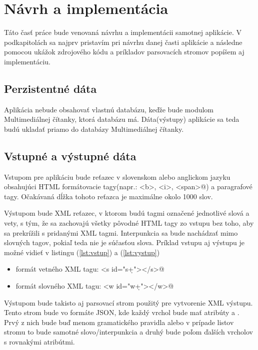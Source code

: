 \documentclass[12pt,a4paper]{report}
\theoremstyle{definition}
\theoremstyle{remark}
\begin{document}

\chapter{Návrh a implementácia}
Táto časť práce bude venovaná návrhu a implementácii samotnej aplikácie. V podkapitolách sa najprv pristavím pri návrhu danej časti aplikácie a následne pomocou ukážok zdrojového kódu a príkladov parsovacích stromov popíšem aj implementáciu.

\section{Perzistentné dáta}
Aplikácia nebude obsahovať vlastnú databázu, keďže bude modulom Multimediálnej čítanky, ktorá databázu má. Dáta(výstupy) aplikácie sa teda budú ukladať priamo do databázy Multimediálnej čítanky.

\section{Vstupné a výstupné dáta}
Vstupom pre aplikáciu bude reťazec v slovenskom alebo anglickom jazyku obsahujúci HTML formátovacie tagy(napr.: \verb@<b>, <i>, <span>@) a paragrafové tagy. Očakávaná dĺžka tohoto reťazca je maximálne okolo 1000 slov.

Výstupom bude XML reťazec, v ktorom budú tagmi označené jednotlivé slová a vety, s tým, že sa zachovajú všetky pôvodné HTML tagy zo vstupu bez toho, aby sa prekrížili s pridanými XML tagmi. Interpunkcia sa bude nachádzať mimo slovných tagov, pokiaľ teda nie je súčasťou slova. Príklad vstupu aj výstupu je možné vidieť v listingu (\ref{lst:vstup}) a (\ref{lst:vystup})
\begin{itemize}
\item formát vetného XML tagu: \verb@<s id="s\d+"></s>@
\item formát slovného XML tagu: \verb@<w id="w\d+"></w>@
\end{itemize}

Výstupom bude takisto aj parsovací strom použitý pre vytvorenie XML výstupu. Tento strom bude vo formáte JSON, kde každý vrchol bude mať atribúty \verb@name@ a \verb@children@. Prvý z nich bude buď menom gramatického pravidla alebo v prípade listov stromu to bude samotné slovo/interpunkcia a druhý bude poľom ďalších vrcholov s rovnakými atribútmi.
\end{document}
